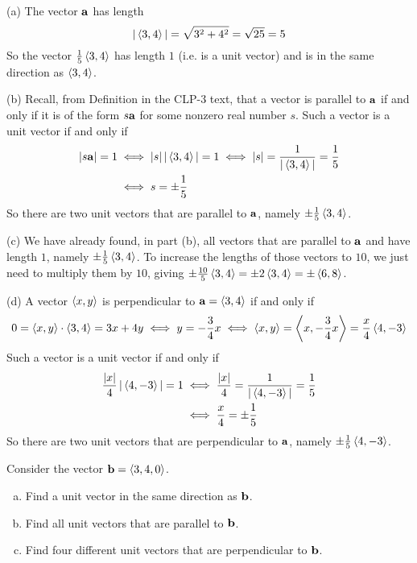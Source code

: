 \begin{solution}
(a) The vector $\mathbf{a}$ has length
\begin{equation*}
|\left< 3,4 \right>|
=\sqrt{3^2+4^2}
=\sqrt{25}
=5
\end{equation*}
So the vector $\frac{1}{5}\left< 3,4 \right>$ has length $1$ (i.e. is a unit vector)
and is in the same direction as  $\left< 3,4 \right>$.

(b) Recall, from Definition  in the CLP-3 text, that a vector is parallel to $\mathbf{a}$ if and only if it is of the form $s\mathbf{a}$
for some nonzero real number $s$. Such a vector is a unit vector if and only if
\begin{align*}
|s\mathbf{a}|=1
&\iff |s|\,|\left< 3,4 \right>|=1
\iff |s| = \frac{1}{|\left< 3,4 \right>|}= \frac{1}{5} \\
&\iff s  = \pm \frac{1}{5}
\end{align*}
So there are two unit vectors that are parallel to $\mathbf{a}$, namely
$\pm\frac{1}{5}\left< 3,4 \right>$.

(c) We have already found, in part (b), all vectors that are parallel to $\mathbf{a}$ and have length $1$, namely $\pm\frac{1}{5}\left< 3,4 \right>$. To increase the 
lengths of those vectors to $10$, we just need to multiply them by $10$, giving
$\pm\frac{10}{5}\left< 3,4 \right>=\pm 2\left< 3,4 \right>=\pm\left< 6,8 \right>$.

(d) A vector $\left< x,y \right>$ is perpendicular to $\mathbf{a}=\left< 3,4\right>$
if and only if
\begin{equation*}
0=\left< x,y \right>\cdot\left< 3,4\right>
 = 3x+4y
\iff y=-\frac{3}{4}x
\iff \left< x,y \right> = \left< x,-\frac{3}{4}x \right> = \frac{x}{4} \left< 4,-3\right>
\end{equation*}
 Such a vector is a unit vector if and only if
\begin{align*}
 \frac{|x|}{4}\,|\left< 4,-3 \right>|=1
&\iff \frac{|x|}{4} = \frac{1}{|\left< 4,-3 \right>|}= \frac{1}{5} \\
&\iff \frac{x}{4}   = \pm \frac{1}{5}
\end{align*}
So there are two unit vectors that are perpendicular to $\mathbf{a}$, namely
$\pm\frac{1}{5}\left< 4,-3 \right>$.



\end{solution}


\begin{question}
Consider the vector $\mathbf{b}=\left< 3,4,0 \right>$.
\begin{enumerate}[(a)]
\item
Find a unit vector in the same direction as $\mathbf{b}$. 
\item
Find all unit vectors that are parallel to $\mathbf{b}$.
\item
Find four different unit vectors that are perpendicular to $\mathbf{b}$.
\end{enumerate}
\end{question}

